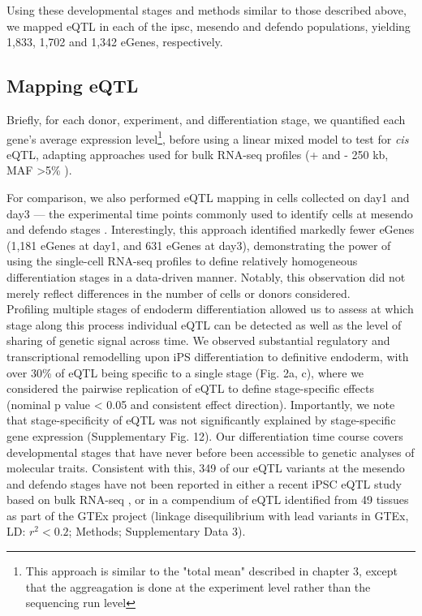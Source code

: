 Using these  developmental stages and methods similar to those described above, we mapped eQTL in each of the \gls{ipsc}, mesendo and defendo populations, yielding 1,833, 1,702 and 1,342 eGenes, respectively. 

\subsection{Mapping eQTL}

Briefly, for each donor, experiment, and differentiation stage, we quantified each gene’s average expression level\footnote{This approach is similar to the "total mean" described in chapter 3, except that the aggreagation is done at the experiment level rather than the sequencing run level}, before using a linear mixed model to test for \textit{cis} eQTL, adapting approaches used for bulk RNA-seq profiles (+ and - 250 kb, MAF >5\% \cite{kilpinen2017common}).

For comparison, we also performed eQTL mapping in cells collected on day1 and day3 — the experimental time points commonly used to identify cells at mesendo and defendo stages \cite{hannan2013production}.
Interestingly, this approach identified markedly fewer eGenes (1,181 eGenes at day1, and 631 eGenes at day3), demonstrating the power of using the single-cell RNA-seq profiles to define relatively homogeneous differentiation stages in a data-driven manner. 
Notably, this observation did not merely reflect differences in the number of cells or donors considered.\\


Profiling multiple stages of endoderm differentiation allowed us to assess at which stage along this process individual eQTL can be detected as well as the level of sharing of genetic signal across time. 
We observed substantial regulatory and transcriptional remodelling upon iPS differentiation to definitive endoderm, with over 30\% of eQTL being specific to a single stage (Fig. 2a, c), where we considered the pairwise replication of eQTL to define stage-specific effects (nominal p value < 0.05 and consistent effect direction). 
Importantly, we note that stage-specificity of eQTL was not significantly explained by stage-specific gene expression (Supplementary Fig. 12). 
Our differentiation time course covers developmental stages that have never before been accessible to genetic analyses of molecular traits. 
Consistent with this, 349 of our eQTL variants at the mesendo and defendo stages have not been reported in either a recent iPSC eQTL study based on bulk RNA-seq \cite{mirauta2018population}, or in a compendium of eQTL identified from 49 tissues as part of the GTEx project \cite{gtex2017genetic} (linkage disequilibrium with lead variants in GTEx, LD: $r^2<0.2$; Methods; Supplementary Data 3).\\

